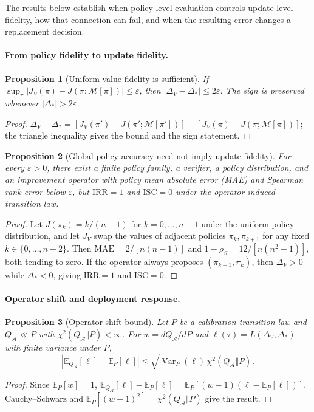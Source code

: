 \documentclass{article}
\newcommand{\E}{\mathbb{E}}
\newcommand{\M}{\mathcal{M}}
\newcommand{\pii}{\pi}
\newcommand{\pip}{\pi'}
\newtheorem{proposition}{Proposition}
\begin{document}
The results below establish when policy-level evaluation controls update-level
fidelity, how that connection can fail, and when the resulting error changes a
replacement decision.

\paragraph{From policy fidelity to update fidelity.}
\begin{proposition}[Uniform value fidelity is sufficient]
If $\sup_\pi|J_V(\pi)-J(\pi;\M[\pi])|\leq\varepsilon$, then
$|\Delta_V-\Delta_*|\leq2\varepsilon$. The sign is preserved whenever
$|\Delta_*|>2\varepsilon$.
\end{proposition}
\begin{proof}
$\Delta_V-\Delta_*=
[J_V(\pip)-J(\pip;\M[\pip])]-[J_V(\pii)-J(\pii;\M[\pii])]$; the triangle
inequality gives the bound and the sign statement.
\end{proof}

\begin{proposition}[Global policy accuracy need not imply update fidelity]
For every $\varepsilon>0$, there exist a finite policy family, a verifier,
a policy distribution, and an improvement operator with policy mean absolute error (MAE) and
Spearman rank error below $\varepsilon$, but $\mathrm{IRR}=1$ and
$\mathrm{ISC}=0$ under the operator-induced transition law.
\end{proposition}
\begin{proof}
Let $J(\pi_k)=k/(n-1)$ for $k=0,\ldots,n-1$ under the uniform policy
distribution, and let $J_V$ swap the values of adjacent policies
$\pi_k,\pi_{k+1}$ for any fixed $k\in\{0,\ldots,n-2\}$. Then
$\mathrm{MAE}=2/[n(n-1)]$ and $1-\rho_S=12/[n(n^2-1)]$, both tending to
zero. If the operator always proposes $(\pi_{k+1},\pi_k)$, then
$\Delta_V>0$ while $\Delta_*<0$, giving $\mathrm{IRR}=1$ and
$\mathrm{ISC}=0$.
\end{proof}

\paragraph{Operator shift and deployment response.}
\begin{proposition}[Operator shift bound]\label{prop:operator-shift}
Let $P$ be a calibration transition law and $Q_{\mathcal A}\ll P$ with
$\chi^2(Q_{\mathcal A}\Vert P)<\infty$. For
$w=dQ_{\mathcal A}/dP$ and $\ell(\tau)=L(\Delta_V,\Delta_*)$ with finite
variance under $P$,
\begin{equation}
  \left|
    \E_{Q_{\mathcal A}}[\ell]-\E_P[\ell]
  \right|
  \leq
  \sqrt{
    \operatorname{Var}_P(\ell)\,
    \chi^2(Q_{\mathcal A}\Vert P)
  }.
  \label{eq:operator-shift}
\end{equation}
\end{proposition}
\begin{proof}
Since $\E_P[w]=1$,
$\E_{Q_{\mathcal A}}[\ell]-\E_P[\ell]
=\E_P[(w-1)(\ell-\E_P[\ell])]$.
Cauchy--Schwarz and
$\E_P[(w-1)^2]=\chi^2(Q_{\mathcal A}\Vert P)$ give the result.
\end{proof}
\end{document}
